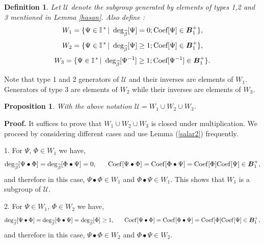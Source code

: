 \documentclass[10pt]{article}
\newcommand{\be}{\begin{equation}}
\newcommand{\ee}{\end{equation}}
\newcommand{\nn}{\nonumber}
\newcommand{\mIs}{{{\mathbb I}}^{\,*}}
\newcommand{\PP}{\boldsymbol{B}^{+}_1}
\newtheorem{definition}{Definition}
\newtheorem{pro}{Proposition}
\begin{document}
{{\begin{definition}\label{albert}{Let  $\mathcal U$ denote the subgroup generated by elements of types 1,2 and 3 mentioned in Lemma \ref{hasan}.
Also define : \be W_1=\{\Psi\in \mIs\,|\,\,\, {\rm
deg_{\widehat{\beta}}}[\Psi]=0; {\rm Coef[\Psi]}\in \PP \}, \nn\ee
\be W_2=\{\Psi\in \mIs\,|\,\,\, {\rm
deg_{\widehat{\beta}}}[\Psi]\ge1; {\rm Coef[\Psi]}\in\PP \}, \nn\ee
\be W_3=\{\Psi\in \mIs\,|\,\,\, {\rm
deg_{\widehat{\beta}}}[\Psi^{-1}]\ge1; {\rm Coef[\Psi^{-1}]}\in\PP
\}. \nn\ee }
\end{definition}

Note that type 1 and 2 generators of ${\mathcal U}$ and their
inverses are elements of $W_1$. Generators of type 3 are elements of
$W_2$ while their inverses are elements of $W_3$.\\

\begin{pro}\label{salar}{ With the above notation ${\mathcal U}=W_1\cup W_2 \cup W_3 $.\\}
\end{pro}

{\bf Proof.} It suffices to prove that $W_1\cup W_2 \cup W_3 $ is
closed under multiplication. We proceed by considering different
cases and use Lemma (\ref{salar2}) frequently.\\


\begin{itemize}
{\item[]{1.\hspace{0.5cm} For $\Psi$, $\Phi\in W_1$ we have, \be
{\rm deg_{\widehat{\beta}}}[\Psi\bullet\Phi]= {\rm
deg_{\widehat{\beta}}}[\Phi\bullet\Psi]= 0, \hspace{0.6cm} {\rm
Coef}[\Psi\bullet\Phi]=
 {\rm Coef}[\Phi\bullet\Psi]=  {\rm Coef}[\Phi] {\rm Coef}[\Psi]\in\PP,\nn\ee
and therefore in this case, $ \Psi\bullet\Phi \in W_1$ and
$\Phi\bullet\Psi \in W_1$. This shows that $W_1$ is a subgroup of
$\mathcal U$.}

\item[]{2.\hspace{0.5cm} For $\Psi \in W_1$, $\Phi\in W_2$ we have, \be {\rm
deg_{\widehat{\beta}}}[\Psi\bullet\Phi]= {\rm
deg_{\widehat{\beta}}}[\Phi\bullet\Psi]= {\rm
deg_{\widehat{\beta}}}[\Phi]\geq  1,\hspace{0.6cm} {\rm
Coef}[\Psi\bullet\Phi]=
 {\rm Coef}[\Phi\bullet\Psi]=  {\rm Coef}[\Phi] {\rm Coef}[\Psi]\in\PP,\nn\ee
  and therefore in this case, $ \Psi\bullet\Phi \in W_2$ and $\Phi\bullet\Psi \in
 W_2$.}

}
\end{itemize}}}
\end{document}
